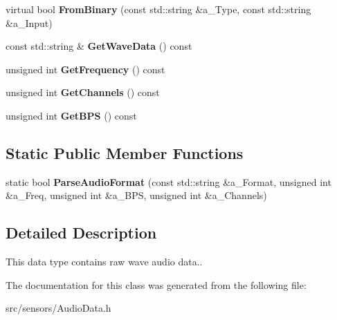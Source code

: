 \begin{DoxyCompactItemize}
virtual bool {\bfseries From\+Binary} (const std\+::string \&a\+\_\+\+Type, const std\+::string \&a\+\_\+\+Input)
\item 
\mbox{\label{class_audio_data_aa48989be23c171180a31544dc4059f57}} 
const std\+::string \& {\bfseries Get\+Wave\+Data} () const
\item 
\mbox{\label{class_audio_data_af99b89b200428c821c6dddc9f823b618}} 
unsigned int {\bfseries Get\+Frequency} () const
\item 
\mbox{\label{class_audio_data_a04b3b6246c09ee366260c4b6fb456196}} 
unsigned int {\bfseries Get\+Channels} () const
\item 
\mbox{\label{class_audio_data_a33ec30b595bcdb8ce9eaf2b8fd8fbf20}} 
unsigned int {\bfseries Get\+B\+PS} () const
\end{DoxyCompactItemize}
\subsection*{Static Public Member Functions}
\begin{DoxyCompactItemize}
\item 
\mbox{\label{class_audio_data_a128642493aaf25366ebb1ebc49280f3d}} 
static bool {\bfseries Parse\+Audio\+Format} (const std\+::string \&a\+\_\+\+Format, unsigned int \&a\+\_\+\+Freq, unsigned int \&a\+\_\+\+B\+PS, unsigned int \&a\+\_\+\+Channels)
\end{DoxyCompactItemize}


\subsection{Detailed Description}
This data type contains raw wave audio data.. 

The documentation for this class was generated from the following file\+:\begin{DoxyCompactItemize}
\item 
src/sensors/Audio\+Data.\+h\end{DoxyCompactItemize}
